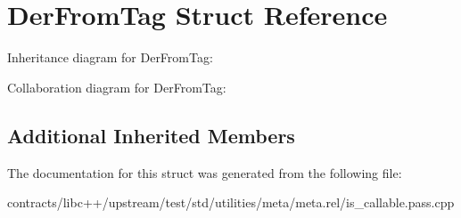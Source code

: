 \hypertarget{struct_der_from_tag}{}\section{Der\+From\+Tag Struct Reference}
\label{struct_der_from_tag}


Inheritance diagram for Der\+From\+Tag\+:


Collaboration diagram for Der\+From\+Tag\+:
\subsection*{Additional Inherited Members}


The documentation for this struct was generated from the following file\+:\begin{DoxyCompactItemize}
\item 
contracts/libc++/upstream/test/std/utilities/meta/meta.\+rel/is\+\_\+callable.\+pass.\+cpp\end{DoxyCompactItemize}

